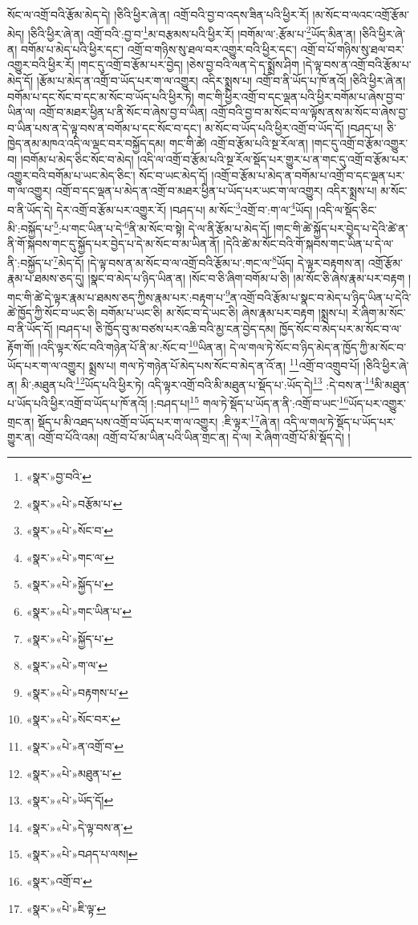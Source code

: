 སོང་ལ་འགྲོ་བའི་རྩོམ་མེད་དེ། །ཅིའི་ཕྱིར་ཞེ་ན། འགྲོ་བའི་བྱ་བ་འདས་ཟིན་པའི་ཕྱིར་རོ། །མ་སོང་བ་ལའང་འགྲོ་རྩོམ་མེད། །ཅིའི་ཕྱིར་ཞེ་ན། འགྲོ་བའི་:བྱ་བ་\footnote{«སྣར་»བྱ་བའི་}མ་བརྩམས་པའི་ཕྱིར་རོ། །བགོམ་ལ་:རྩོམ་པ་\footnote{«སྣར་»«པེ་»བརྩོམ་པ་}ཡོད་མིན་ན། །ཅིའི་ཕྱིར་ཞེ་ན། བགོམ་པ་མེད་པའི་ཕྱིར་དང་། འགྲོ་བ་གཉིས་སུ་ཐལ་བར་འགྱུར་བའི་ཕྱིར་དང་། འགྲོ་བ་པོ་གཉིས་སུ་ཐལ་བར་འགྱུར་བའི་ཕྱིར་རོ། །གང་དུ་འགྲོ་བ་རྩོམ་པར་བྱེད། །ཅེས་བྱ་བའི་ལན་དེ་ད་སྨྲོས་ཤིག །དེ་ལྟ་བས་ན་འགྲོ་བའི་རྩོམ་པ་མེད་དོ། །རྩོམ་པ་མེད་ན་འགྲོ་བ་ཡོད་པར་ག་ལ་འགྱུར། འདིར་སྨྲས་པ། འགྲོ་བ་ནི་ཡོད་པ་ཁོ་ནའོ། །ཅིའི་ཕྱིར་ཞེ་ན། བགོམ་པ་དང་སོང་བ་དང་མ་སོང་བ་ཡོད་པའི་ཕྱིར་ཏེ། གང་གི་ཕྱིར་འགྲོ་བ་དང་ལྡན་པའི་ཕྱིར་བགོམ་པ་ཞེས་བྱ་བ་ཡིན་ལ། འགྲོ་བ་མཐར་ཕྱིན་པ་ནི་སོང་བ་ཞེས་བྱ་བ་ཡིན། འགྲོ་བའི་བྱ་བ་མ་སོང་བ་ལ་ལྟོས་ནས་མ་སོང་བ་ཞེས་བྱ་བ་ཡིན་པས་ན་དེ་ལྟ་བས་ན་བགོམ་པ་དང་སོང་བ་དང་། མ་སོང་བ་ཡོད་པའི་ཕྱིར་འགྲོ་བ་ཡོད་དོ། །བཤད་པ། ཅི་ཁྱེད་ནམ་མཁའ་འདི་ལ་ལྡང་བར་བསྐྱོད་དམ། གང་གི་ཚེ། འགྲོ་བ་རྩོམ་པའི་སྔ་རོལ་ན། །གང་དུ་འགྲོ་བ་རྩོམ་འགྱུར་བ། །བགོམ་པ་མེད་ཅིང་སོང་བ་མེད། །འདི་ལ་འགྲོ་བ་རྩོམ་པའི་སྔ་རོལ་སྡོད་པར་གྱུར་པ་ན་གང་དུ་འགྲོ་བ་རྩོམ་པར་འགྱུར་བའི་བགོམ་པ་ཡང་མེད་ཅིང་། སོང་བ་ཡང་མེད་དོ། །འགྲོ་བ་རྩོམ་པ་མེད་ན་བགོམ་པ་འགྲོ་བ་དང་ལྡན་པར་ག་ལ་འགྱུར། འགྲོ་བ་དང་ལྡན་པ་མེད་ན་འགྲོ་བ་མཐར་ཕྱིན་པ་ཡོད་པར་ཡང་ག་ལ་འགྱུར། འདིར་སྨྲས་པ། མ་སོང་བ་ནི་ཡོད་དེ། དེར་འགྲོ་བ་རྩོམ་པར་འགྱུར་རོ། །བཤད་པ། མ་སོང་\footnote{«སྣར་»«པེ་»སོང་བ་}འགྲོ་བ་:ག་ལ་\footnote{«སྣར་»«པེ་»གང་ལ་}ཡོད། །འདི་ལ་སྡོད་ཅིང་མི་:བསྐྱོད་པ་\footnote{«སྣར་»«པེ་»སྐྱོད་པ་}:པ་གང་ཡིན་པ་དེ་\footnote{«སྣར་»«པེ་»གང་ཡིན་པ་}ནི་མ་སོང་བ་སྟེ། དེ་ལ་ནི་རྩོམ་པ་མེད་དོ། །གང་གི་ཚེ་སྐྱོད་པར་བྱེད་པ་དེའི་ཚེ་ན་ནི་གོ་སྐབས་གང་དུ་སྐྱོད་པར་བྱེད་པ་དེ་མ་སོང་བ་མ་ཡིན་ནོ། །དེའི་ཚེ་མ་སོང་བའི་གོ་སྐབས་གང་ཡིན་པ་དེ་ལ་ནི་:བསྐྱོད་པ་\footnote{«སྣར་»«པེ་»སྐྱོད་པ་}མེད་དོ། །དེ་ལྟ་བས་ན་མ་སོང་བ་ལ་འགྲོ་བའི་རྩོམ་པ་:གང་ལ་\footnote{«སྣར་»«པེ་»ག་ལ་}ཡོད། དེ་ལྟར་བརྟགས་ན། འགྲོ་རྩོམ་རྣམ་པ་ཐམས་ཅད་དུ། །སྣང་བ་མེད་པ་ཉིད་ཡིན་ན། །སོང་བ་ཅི་ཞིག་བགོམ་པ་ཅི། །མ་སོང་ཅི་ཞེས་རྣམ་པར་བརྟག །གང་གི་ཚེ་དེ་ལྟར་རྣམ་པ་ཐམས་ཅད་ཀྱིས་རྣམ་པར་:བརྟག་པ་\footnote{«སྣར་»«པེ་»བརྟགས་པ་}ན་འགྲོ་བའི་རྩོམ་པ་སྣང་བ་མེད་པ་ཉིད་ཡིན་པ་དེའི་ཚེ་ཁྱོད་ཀྱི་སོང་བ་ཡང་ཅི། བགོམ་པ་ཡང་ཅི། མ་སོང་བ་དེ་ཡང་ཅི། ཞེས་རྣམ་པར་བརྟག །སྨྲས་པ། རེ་ཞིག་མ་སོང་བ་ནི་ཡོད་དོ། །བཤད་པ། ཅི་ཁྱོད་བུ་མ་བཙས་པར་འཆི་བའི་མྱ་ངན་བྱེད་དམ། ཁྱོད་སོང་བ་མེད་པར་མ་སོང་བ་ལ་རྟོག་གོ། །འདི་ལྟར་སོང་བའི་གཉེན་པོ་ནི་མ་:སོང་བ་\footnote{«སྣར་»«པེ་»སོང་བར་}ཡིན་ན། དེ་ལ་གལ་ཏེ་སོང་བ་ཉིད་མེད་ན་ཁྱོད་ཀྱི་མ་སོང་བ་ཡོད་པར་ག་ལ་འགྱུར། སྨྲས་པ། གལ་ཏེ་གཉེན་པོ་མེད་པས་སོང་བ་མེད་ན་འོ་ན། \footnote{«སྣར་»«པེ་»ན་འགྲོ་བ་}འགྲོ་བ་འགྲུབ་པོ། །ཅིའི་ཕྱིར་ཞེ་ན། མི་:མཐུན་པའི་\footnote{«སྣར་»«པེ་»མཐུན་པ་}ཡོད་པའི་ཕྱིར་ཏེ། འདི་ལྟར་འགྲོ་བའི་མི་མཐུན་པ་སྡོད་པ་:ཡོད་དེ།\footnote{«སྣར་»«པེ་»ཡོད་དོ།} :དེ་བས་ན་\footnote{«སྣར་»«པེ་»དེ་ལྟ་བས་ན་}མི་མཐུན་པ་ཡོད་པའི་ཕྱིར་འགྲོ་བ་ཡོད་པ་ཁོ་ནའོ། །:བཤད་པ།\footnote{«སྣར་»«པེ་»བཤད་པ་ལས།} གལ་ཏེ་སྡོད་པ་ཡོད་ན་ནི་:འགྲོ་བ་ཡང་\footnote{«སྣར་»འགྲོ་བ་}ཡོད་པར་འགྱུར་གྲང་ན། སྡོད་པ་མི་འཐད་པས་འགྲོ་བ་ཡོད་པར་ག་ལ་འགྱུར། :ཇི་ལྟར་\footnote{«སྣར་»«པེ་»ཇི་ལྟ་}ཞེ་ན། འདི་ལ་གལ་ཏེ་སྡོད་པ་ཡོད་པར་གྱུར་ན། འགྲོ་བ་པོའི་འམ། འགྲོ་བ་པོ་མ་ཡིན་པའི་ཡིན་གྲང་ན། དེ་ལ། རེ་ཞིག་འགྲོ་པོ་མི་སྡོད་དེ། །
